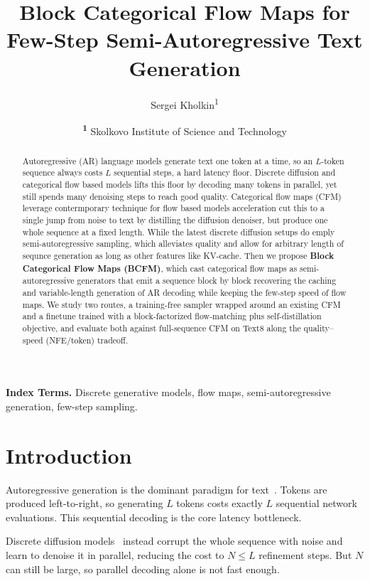 \documentclass[twocolumn]{style}
\title{Block Categorical Flow Maps for Few-Step Semi-Autoregressive Text Generation}
\author{
    Sergei Kholkin\textsuperscript{1}
}
\date{
    \textsuperscript{\textbf{1}}
    Skolkovo Institute of Science and Technology
}
\begin{document}
\twocolumn[\maketitle]
\small
\begin{abstract}
    \noindent Autoregressive (AR) language models generate text one token at a time, so an $L$-token sequence always costs $L$ sequential steps, a hard latency floor. Discrete diffusion and categorical flow based models lifts this floor by decoding many tokens in parallel, yet still spends many denoising steps to reach good quality. Categorical flow maps (CFM) leverage contermporary technique for flow based models acceleration cut this to a single jump from noise to text by distilling the diffusion denoiser, but produce one whole sequence at a fixed length. While the latest discrete diffusion setups do emply semi-autoregressive sampling, which alleviates quality and allow for arbitrary length of sequnce generation as long as other features like KV-cache. Then we propose \textbf{Block Categorical Flow Maps (BCFM)}, which cast categorical flow maps as semi-autoregressive generators that emit a sequence block by block recovering the caching and variable-length generation of AR decoding while keeping the few-step speed of flow maps. We study two routes, a training-free sampler wrapped around an existing CFM and a finetune trained with a block-factorized flow-matching plus self-distillation objective, and evaluate both against full-sequence CFM on Text8 along the quality--speed (NFE/token) tradeoff.
\end{abstract}

\noindent\small{\textbf{Index Terms.} Discrete generative models, flow maps, semi-autoregressive generation, few-step sampling.}

\section{Introduction}
Autoregressive generation is the dominant paradigm for text~\citep{radford2019gpt2, grattafiori2024llama3}. Tokens are produced left-to-right, so generating $L$ tokens costs exactly $L$ sequential network evaluations. This sequential decoding is the core latency bottleneck.

Discrete diffusion models~\citep{sahoo2024mdlm, lou2023sedd, sahoo2025duo} instead corrupt the whole sequence with noise and learn to denoise it in parallel, reducing the cost to $N \le L$ refinement steps. But $N$ can still be large, so parallel decoding alone is not fast enough.
\end{document}
